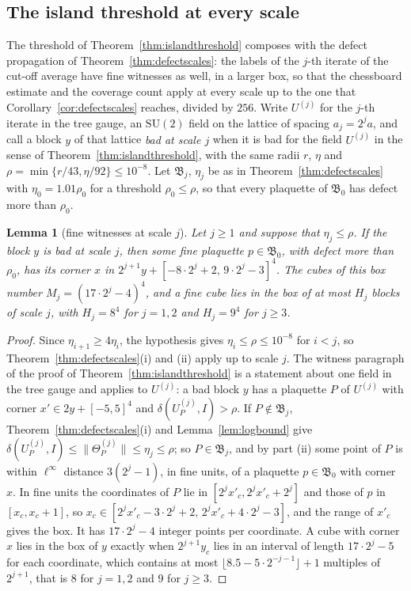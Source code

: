 \documentclass[11pt]{amsart}
\newtheorem{lemma}[theorem]{Lemma}
\theoremstyle{definition}
\theoremstyle{remark}
\numberwithin{equation}{section}
\newcommand{\SU}{\mathrm{SU}}
\begin{document}
\subsection{The island threshold at every scale}\label{ssec:islandscales}

The threshold of Theorem~\ref{thm:islandthreshold} composes with the
defect propagation of Theorem~\ref{thm:defectscales}: the labels of the
$j$-th iterate of the cut-off average have fine witnesses as well, in a
larger box, so that the chessboard estimate and the coverage count apply at
every scale up to the one that Corollary~\ref{cor:defectscales} reaches,
divided by $256$. Write $U^{(j)}$ for the $j$-th iterate in the tree gauge,
an $\SU(2)$ field on the lattice of spacing $a_j=2^ja$, and call a block
$y$ of that lattice \emph{bad at scale $j$} when it is bad for the field
$U^{(j)}$ in the sense of Theorem~\ref{thm:islandthreshold}, with the same
radii $r$, $\eta$ and $\rho=\min\{r/43,\eta/92\}\le10^{-8}$. Let
$\mathfrak B_j$, $\eta_j$ be as in Theorem~\ref{thm:defectscales} with
$\eta_0=1.01\rho_0$ for a threshold $\rho_0\le\rho$, so that every
plaquette of $\mathfrak B_0$ has defect more than $\rho_0$.

\begin{lemma}[fine witnesses at scale $j$]\label{lem:scalewitness}
Let $j\ge1$ and suppose that $\eta_j\le\rho$. If the block $y$ is bad at
scale $j$, then some fine plaquette $p\in\mathfrak B_0$, with defect more
than $\rho_0$, has its corner $x$ in $2^{j+1}y+[-8\cdot2^j+2,\,9\cdot2^j-3]^4$.
The cubes of this box number $M_j=(17\cdot2^j-4)^4$, and a fine cube lies in
the box of at most $H_j$ blocks of scale $j$, with $H_j=8^4$ for $j=1,2$
and $H_j=9^4$ for $j\ge3$.
\end{lemma}

\begin{proof}
Since $\eta_{i+1}\ge4\eta_i$, the hypothesis gives $\eta_i\le\rho\le
10^{-8}$ for $i<j$, so Theorem~\ref{thm:defectscales}(i) and (ii) apply up
to scale $j$. The witness paragraph of the proof of
Theorem~\ref{thm:islandthreshold} is a statement about one field in the
tree gauge and applies to $U^{(j)}$: a bad block $y$ has a plaquette $P$
of $U^{(j)}$ with corner $x'\in2y+[-5,5]^4$ and $\delta(U^{(j)}_P,I)>\rho$.
If $P\notin\mathfrak B_j$, Theorem~\ref{thm:defectscales}(i) and
Lemma~\ref{lem:logbound} give $\delta(U^{(j)}_P,I)\le\lVert\Theta^{(j)}_P
\rVert\le\eta_j\le\rho$; so $P\in\mathfrak B_j$, and by part (ii) some point
of $P$ is within $\ell^\infty$ distance $3(2^j-1)$, in fine units, of a
plaquette $p\in\mathfrak B_0$ with corner $x$. In fine units the
coordinates of $P$ lie in $[2^jx'_c,2^jx'_c+2^j]$ and those of $p$ in
$[x_c,x_c+1]$, so $x_c\in[2^jx'_c-3\cdot2^j+2,\,2^jx'_c+4\cdot2^j-3]$, and
the range of $x'_c$ gives the box. It has $17\cdot2^j-4$ integer points per
coordinate. A cube with corner $x$ lies in the box of $y$ exactly when
$2^{j+1}y_c$ lies in an interval of length $17\cdot2^j-5$ for each
coordinate, which contains at most $\lfloor8.5-5\cdot2^{-j-1}\rfloor+1$
multiples of $2^{j+1}$, that is $8$ for $j=1,2$ and $9$ for $j\ge3$.
\end{proof}
\end{document}
